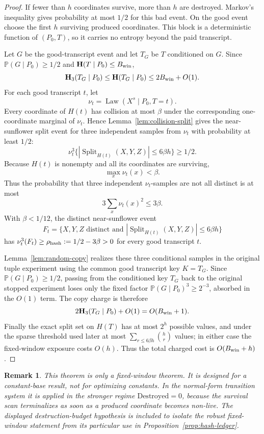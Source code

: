 \documentclass[11pt]{article}
\newtheorem{remark}[theorem]{Remark}
\newcommand{\Prb}{\mathbb P}
\newcommand{\bfH}{\mathbf H}
\newcommand{\Split}{\operatorname{Split}}
\newcommand{\Law}{\operatorname{Law}}
\begin{document}
\begin{proof}
If fewer than $h$ coordinates survive, more than $h$ are destroyed.  Markov's
inequality gives probability at most $1/2$ for this bad event.  On the good
event choose the first $h$ surviving produced coordinates.  This block is a
deterministic function of $(P_0,T)$, so it carries no entropy beyond the paid
transcript.

Let $G$ be the good-transcript event and let $T_G$ be $T$ conditioned on $G$.
Since $\Prb(G\mid P_0)\ge1/2$ and $\bfH(T\mid P_0)\le B_{\rm win}$,
\[
  \bfH_3(T_G\mid P_0)\le \bfH(T_G\mid P_0)\le 2B_{\rm win}+O(1).
\]
For each good transcript $t$, let
\[
  \nu_t=\Law(X^s\mid P_0,T=t).
\]
Every coordinate of $H(t)$ has collision at most $\beta$ under the
corresponding one-coordinate marginal of $\nu_t$.  Hence
Lemma~\ref{lem:collision-split} gives the near-sunflower split event for
three independent samples from $\nu_t$ with probability at least $1/2$:
\[
  \nu_t^3\{|\Split_{H(t)}(X,Y,Z)|\le 6\beta h\}\ge 1/2 .
\]
Because $H(t)$ is nonempty and all its coordinates are surviving,
\[
  \max_x\nu_t(x)<\beta .
\]
Thus the probability that three independent $\nu_t$-samples are not all
distinct is at most
\[
  3\sum_x\nu_t(x)^2\le 3\beta .
\]
With $\beta<1/12$, the distinct near-sunflower event
\[
  F_t=\{X,Y,Z\text{ distinct and }|\Split_{H(t)}(X,Y,Z)|\le 6\beta h\}
\]
has $\nu_t^3(F_t)\ge\rho_{\rm hash}:=1/2-3\beta>0$ for every good transcript
$t$.

Lemma~\ref{lem:random-copy} realizes these three conditional samples in the
original tuple experiment using the common good transcript key
$K=T_G$.  Since $\Prb(G\mid P_0)\ge1/2$, passing from the conditioned key
$T_G$ back to the original stopped experiment loses only the fixed factor
$\Prb(G\mid P_0)^3\ge 2^{-3}$, absorbed in the $O(1)$ term.  The copy charge is
therefore
\[
  2\bfH_3(T_G\mid P_0)+O(1)=O(B_{\rm win}+1).
\]
Finally the exact split set on $H(T)$ has at most $2^h$ possible values, and
under the sparse threshold used later at most
$\sum_{r\le 6\beta h}\binom hr$ values; in either case the fixed-window
exposure costs $O(h)$.  Thus the total charged cost is $O(B_{\rm win}+h)$.
\end{proof}

\begin{remark}
This theorem is only a fixed-window theorem.  It is designed for a
constant-base result, not for optimizing constants.
In the normal-form transition system it is applied in the stronger regime
$\mathrm{Destroyed}=0$, because the survival scan terminalizes as soon as a
produced coordinate becomes non-live.  The displayed destruction-budget
hypothesis is included to isolate the robust fixed-window statement from its
particular use in Proposition~\ref{prop:hash-ledger}.
\end{remark}
\end{document}
